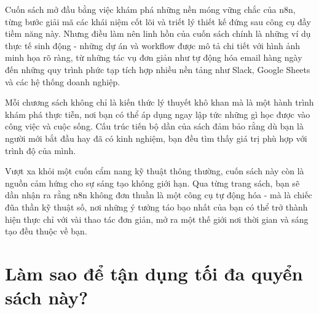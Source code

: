 \documentclass[a4paper,12pt,oneside]{book}
\begin{document}
Cuốn sách mở đầu bằng việc khám phá những nền móng vững chắc của n8n, từng bước giải mã các khái niệm cốt lõi và triết lý thiết kế đứng sau công cụ đầy tiềm năng này. Nhưng điều làm nên linh hồn của cuốn sách chính là những ví dụ thực tế sinh động - những dự án và workflow được mô tả chi tiết với hình ảnh minh họa rõ ràng, từ những tác vụ đơn giản như tự động hóa email hàng ngày đến những quy trình phức tạp tích hợp nhiều nền tảng như Slack, Google Sheets và các hệ thống doanh nghiệp.

Mỗi chương sách không chỉ là kiến thức lý thuyết khô khan mà là một hành trình khám phá thực tiễn, nơi bạn có thể áp dụng ngay lập tức những gì học được vào công việc và cuộc sống. Cấu trúc tiến bộ dần của sách đảm bảo rằng dù bạn là người mới bắt đầu hay đã có kinh nghiệm, bạn đều tìm thấy giá trị phù hợp với trình độ của mình.

Vượt xa khỏi một cuốn cẩm nang kỹ thuật thông thường, cuốn sách này còn là nguồn cảm hứng cho sự sáng tạo không giới hạn. Qua từng trang sách, bạn sẽ dần nhận ra rằng n8n không đơn thuần là một công cụ tự động hóa - mà là chiếc đũa thần kỹ thuật số, nơi những ý tưởng táo bạo nhất của bạn có thể trở thành hiện thực chỉ với vài thao tác đơn giản, mở ra một thế giới nơi thời gian và sáng tạo đều thuộc về bạn.

\newpage

\section*{Làm sao để tận dụng tối đa quyển sách này?}
\end{document}
